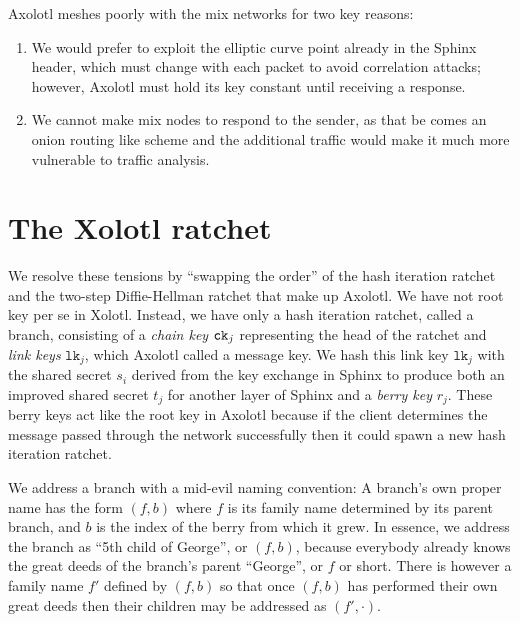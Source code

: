 \documentclass[twoside,letterpaper]{llncs}
\begin{document}
Axolotl meshes poorly with the mix networks for two key reasons:
\begin{enumerate}
 \item
 We would prefer to exploit the elliptic curve point
 already in the Sphinx header, which must change with each packet
 to avoid correlation attacks; 
 however, Axolotl must hold its key constant until receiving a response.
 \item
 We cannot make mix nodes to respond to the sender, as that
 be comes an onion routing like scheme and the additional traffic
 would make it much more vulnerable to traffic analysis.
\end{enumerate}


\section{The Xolotl ratchet}

\def\cn{\texttt{cn}}
\def\DH{\texttt{DH}}
\def\lk{\texttt{lk}}
\def\sk{\texttt{sk}}
\def\ECDH{\textrm{ECDH}}

We resolve these tensions by ``swapping the order'' of the hash
iteration ratchet and the two-step Diffie-Hellman ratchet that make
up Axolotl.   
%
We have not root key per se in Xolotl.  
Instead, we have only a hash iteration ratchet, called a branch,
consisting of a {\it chain key} $\texttt{ck}_j$ representing the head of the
ratchet and {\it link keys} $\lk_j$, which Axolotl called a message
key.  We hash this link key $\lk_j$ with the shared secret $s_i$
derived from the key exchange in Sphinx to produce both an improved
shared secret $t_j$ for another layer of Sphinx and a {\it berry key} $r_j$. 
These berry keys act like the root key in Axolotl because if the
client determines the message passed through the network successfully
then it could spawn a new hash iteration ratchet.

We address a branch with a mid-evil naming convention: 
A branch's own proper name has the form $(f,b)$ where
 $f$ is its family name determined by its parent branch, and
 $b$ is the index of the berry from which it grew.
In essence, we address the branch as ``5th child of George'',
or $(f,b)$, because everybody already knows the great deeds
of the branch's parent ``George'', or $f$ or short. 
There is however a family name $f'$ defined by $(f,b)$ so that
once $(f,b)$ has performed their own great deeds then their
children may be addressed as $(f',\cdot)$.

\smallskip {} 
\end{document}
